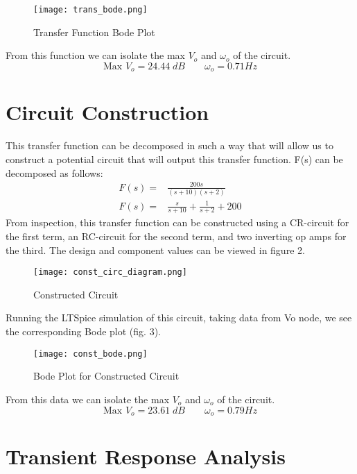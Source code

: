\documentclass[12pt]{article}
\begin{document}
\begin{figure}[H]
    \centering
    \texttt{[image: trans\_bode.png]}
    \caption{Transfer Function Bode Plot}
    \label{fig:Transfer Function Bode Plot}
\end{figure}
From this function we can isolate the max $V_o$ and $\omega_o$ of the circuit.
$$\text{Max }V_o = 24.44\;dB\qquad \omega_o = 0.71 Hz$$


\section*{\textcolor{mycolor}{Circuit Construction}}
This transfer function can be decomposed in such a way that will allow us to construct a potential circuit that will output this transfer function. F(s) can be decomposed as follows:
\begin{align*}
    F(s) =& \frac{200s}{(s+10)(s+2)}\\
    F(s) =& \frac{s}{s+10}+\frac{1}{s+2}+200
\end{align*}
From inspection, this transfer function can be constructed using a CR-circuit for the first term, an RC-circuit for the second term, and two inverting
op amps for the third. The design and component values can be viewed in figure 2.
\begin{figure}[H]
    \centering
    \texttt{[image: const\_circ\_diagram.png]}
    \caption{Constructed Circuit}
    \label{fig:Constructed Circuit}
\end{figure}
Running the LTSpice simulation of this circuit, taking data from Vo node, we see the corresponding Bode plot (fig. 3).
\begin{figure}[H]
    \centering
    \texttt{[image: const\_bode.png]}
    \caption{Bode Plot for Constructed Circuit}
    \label{fig:Bode Constructed Circuit}
\end{figure}
From this data we can isolate the max $V_o$ and $\omega_o$ of the circuit.
$$\text{Max }V_o = 23.61\;dB\qquad \omega_o = 0.79 Hz$$

\section*{\textcolor{mycolor}{Transient Response Analysis}}
\end{document}
